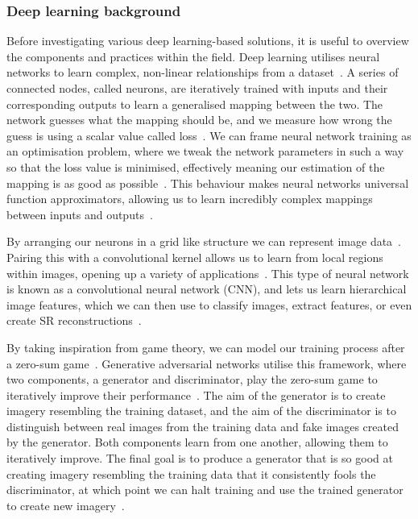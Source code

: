 \subsubsection{Deep learning background}
Before investigating various deep learning-based solutions, it is useful to overview the components and practices within the field. Deep learning utilises neural networks to learn complex, non-linear relationships from a dataset~\cite{ref}. A series of connected nodes, called neurons, are iteratively trained with inputs and their corresponding outputs to learn a generalised mapping between the two. The network guesses what the mapping should be, and we measure how wrong the guess is using a scalar value called loss~\cite{ref}. We can frame neural network training as an optimisation problem, where we tweak the network parameters in such a way so that the loss value is minimised, effectively meaning our estimation of the mapping is as good as possible~\cite{ref}. This behaviour makes neural networks universal function approximators, allowing us to learn incredibly complex mappings between inputs and outputs~\cite{ref}.

By arranging our neurons in a grid like structure we can represent image data~\cite{ref}. Pairing this with a convolutional kernel allows us to learn from local regions within images, opening up a variety of applications~\cite{ref}. This type of neural network is known as a convolutional neural network (CNN), and lets us learn hierarchical image features, which we can then use to classify images, extract features, or even create SR reconstructions~\cite{vgg19,featureExtraction,srcnn}.

By taking inspiration from game theory, we can model our training process after a zero-sum game~\cite{gan}. Generative adversarial networks utilise this framework, where two components, a generator and discriminator, play the zero-sum game to iteratively improve their performance~\cite{gan}. The aim of the generator is to create imagery resembling the training dataset, and the aim of the discriminator is to distinguish between real images from the training data and fake images created by the generator. Both components learn from one another, allowing them to iteratively improve. The final goal is to produce a generator that is so good at creating imagery resembling the training data that it consistently fools the discriminator, at which point we can halt training and use the trained generator to create new imagery~\cite{gan}.

